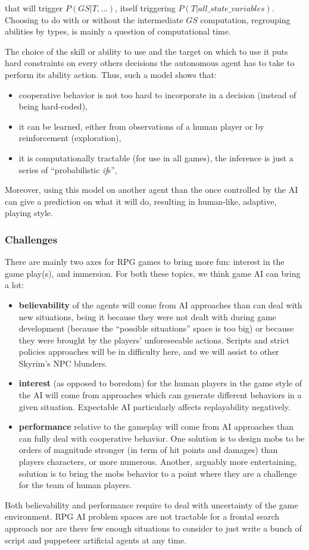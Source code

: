 that will trigger $P(GS|T,\dots)$, itself triggering $P(T|all\_state\_variables)$. Choosing to do with or without the intermediate $GS$ computation, regrouping abilities by types, is mainly a question of computational time.

The choice of the skill or ability to use and the target on which to use it puts hard constraints on every others decisions the autonomous agent has to take to perform its ability action. Thus, such a model shows that:
\begin{itemize}
    \item cooperative behavior is not too hard to incorporate in a decision (instead of being hard-coded),
    \item it can be learned, either from observations of a human player or by reinforcement (exploration),
    \item it is computationally tractable (for use in all games), the inference is just a series of ``probabilistic \textit{if}s'',
\end{itemize}
Moreover, using this model on another agent than the once controlled by the AI can give a prediction on what it will do, resulting in human-like, adaptive, playing style.

\subsubsection{Challenges}

There are mainly two axes for RPG games to bring more fun: interest in the game play(s), and immersion. For both these topics, we think game AI can bring a lot:
\begin{itemize}
    \item \textbf{believability} of the agents will come from AI approaches than can deal with new situations, being it because they were not dealt with during game development (because the ``possible situations'' space is too big) or because they were brought by the players' unforeseeable actions. Scripts and strict policies approaches will be in difficulty here, and we will assist to other Skyrim's NPC blunders.
    \item \textbf{interest} (as opposed to boredom) for the human players in the game style of the AI will come from approaches which can generate different behaviors in a given situation. Expectable AI particularly affects replayability negatively.
    \item \textbf{performance} relative to the gameplay will come from AI approaches than can fully deal with cooperative behavior. One solution is to design mobs to be orders of magnitude stronger (in term of hit points and damages) than players characters, or more numerous. Another, arguably more entertaining, solution is to bring the mobs behavior to a point where they are a challenge for the team of human players.
\end{itemize}
Both believability and performance require to deal with uncertainty of the game environment. RPG AI problem spaces are not tractable for a frontal search approach nor are there few enough situations to consider to just write a bunch of script and puppeteer artificial agents at any time.

